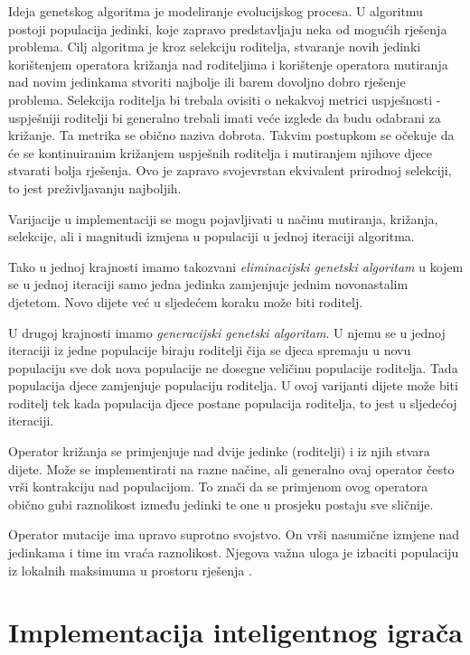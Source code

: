 \documentclass[zavrsnirad]{fer}
\begin{document}
		Ideja genetskog algoritma je modeliranje evolucijskog procesa. U algoritmu postoji populacija jedinki, koje zapravo predstavljaju neka od mogućih rješenja problema. Cilj algoritma je kroz selekciju roditelja, stvaranje novih jedinki korištenjem operatora križanja nad roditeljima i korištenje operatora mutiranja nad novim jedinkama stvoriti najbolje ili barem dovoljno dobro rješenje problema. Selekcija roditelja bi trebala ovisiti o nekakvoj metrici uspješnosti - uspješniji roditelji bi generalno trebali imati veće izglede da budu odabrani za križanje. Ta metrika se obično naziva dobrota. Takvim postupkom se očekuje da će se kontinuiranim križanjem uspješnih roditelja i mutiranjem njihove djece stvarati bolja rješenja. Ovo je zapravo svojevrstan ekvivalent prirodnoj selekciji, to jest preživljavanju najboljih.
	
		Varijacije u implementaciji se mogu pojavljivati u načinu mutiranja, križanja, selekcije, ali i magnitudi izmjena u populaciji u jednoj iteraciji algoritma. 
		
		Tako u jednoj krajnosti imamo takozvani \textit{eliminacijski genetski algoritam} u kojem se u jednoj iteraciji samo jedna jedinka zamjenjuje jednim novonastalim djetetom. Novo dijete već u sljedećem koraku može biti roditelj. \cite{skriptaEvolucijskoRacunarstvo}
		
		U drugoj krajnosti imamo \textit{generacijski genetski algoritam}. U njemu se u jednoj iteraciji iz jedne populacije biraju roditelji čija se djeca spremaju u novu populaciju sve dok nova populacije ne dosegne veličinu populacije roditelja. Tada populacija djece zamjenjuje populaciju roditelja. U ovoj varijanti dijete može biti roditelj tek kada populacija djece postane populacija roditelja, to jest u sljedećoj iteraciji. \cite{skriptaEvolucijskoRacunarstvo}
		
		Operator križanja se primjenjuje nad dvije jedinke (roditelji) i iz njih stvara dijete. Može se implementirati na razne načine, ali generalno ovaj operator često vrši kontrakciju nad populacijom. To znači da se primjenom ovog operatora obično gubi raznolikost između jedinki te one u prosjeku postaju sve sličnije. \cite{skriptaEvolucijskoRacunarstvo}
		
		Operator mutacije ima upravo suprotno svojstvo. On vrši nasumične izmjene nad jedinkama i time im vraća raznolikost. Njegova važna uloga je izbaciti populaciju iz lokalnih maksimuma u prostoru rješenja \cite{skriptaEvolucijskoRacunarstvo}.
	
\chapter{Implementacija inteligentnog igrača}
\label{pog:Implementacija}
\end{document}
